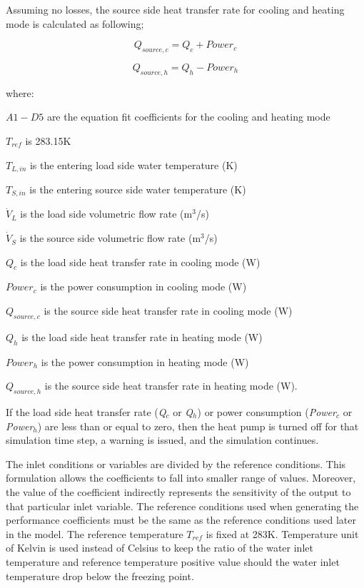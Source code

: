 Assuming no losses, the source side heat transfer rate for cooling and heating mode is calculated as following;

\begin{equation}
{Q_{source,c}} = {Q_c} + Powe{r_c}
\end{equation}

\begin{equation}
{Q_{source,h}} = {Q_h} - Powe{r_h}
\end{equation}

where:

\(A1 - D5\) are the equation fit coefficients for the cooling and heating mode

\({T_{ref}}\) is 283.15K

\({T_{L,in}}\) is the entering load side water temperature (K)

\({T_{S,in}}\) is the entering source side water temperature (K)

\({\dot V_L}\) is the load side volumetric flow rate (m\(^{3}\)/s)

\({\dot V_S}\) is the source side volumetric flow rate (m\(^{3}\)/s)

\({Q_c}\) is the load side heat transfer rate in cooling mode (W)

\(Powe{r_c}\) is the power consumption in cooling mode (W)

\({Q_{source,c}}\) is the source side heat transfer rate in cooling mode (W)

\({Q_h}\) is the load side heat transfer rate in heating mode (W)

\(Powe{r_h}\) is the power consumption in heating mode (W)

\({Q_{source,h}}\) is the source side heat transfer rate in heating mode (W).

If the load side heat transfer rate (\emph{Q\(_{c}\)} or \emph{Q\(_{h}\)}) or power consumption (\emph{Power\(_{c}\)} or \emph{Power\(_{h}\)}) are less than or equal to zero, then the heat pump is turned off for that simulation time step, a warning is issued, and the simulation continues.

The inlet conditions or variables are divided by the reference conditions. This formulation allows the coefficients to fall into smaller range of values. Moreover, the value of the coefficient indirectly represents the sensitivity of the output to that particular inlet variable. The reference conditions used when generating the performance coefficients must be the same as the reference conditions used later in the model. The reference temperature \({T_{ref}}\) is fixed at 283K. Temperature unit of Kelvin is used instead of Celsius to keep the ratio of the water inlet temperature and reference temperature positive value should the water inlet temperature drop below the freezing point.

